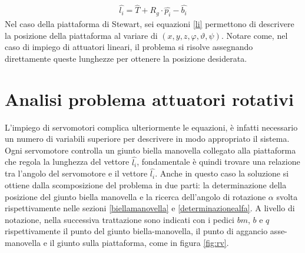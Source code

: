 \documentclass[12pt,twoside,openright]{report}
\begin{document}
\begin{align}\label{li}
\hat{l_i}=\hat{T}+R_g\cdot \hat{p_i}-\hat{b_i}
\end{align}
Nel caso della piattaforma di Stewart, sei equazioni \eqref{li} permettono di descrivere la posizione della piattaforma al variare di $(x,y,z,\varphi,\vartheta,\psi)$.
Notare come, nel caso di impiego di attuatori lineari, il problema si risolve assegnando direttamente queste lunghezze per ottenere la posizione desiderata. 

\section{Analisi problema attuatori rotativi}\label{rotation}
L'impiego di servomotori complica ulteriormente le equazioni, è infatti necessario un numero di variabili superiore per descrivere in modo appropriato il sistema. Ogni servomotore controlla un giunto biella manovella collegato alla piattaforma che regola la lunghezza del vettore $\hat{l_i}$, fondamentale è quindi trovare una relazione tra l'angolo del servomotore e il vettore $\hat{l_i}$. Anche in questo caso la soluzione si ottiene dalla scomposizione del problema in due parti: la determinazione della posizione del giunto biella manovella e la ricerca dell'angolo di rotazione $\alpha$ svolta rispettivamente nelle sezioni \ref{biellamanovella} e \ref{determinazionealfa}. A livello di notazione, nella successiva trattazione sono indicati con i pedici $bm$, $b$ e $q$ rispettivamente il punto del giunto biella-manovella, il punto di aggancio asse-manovella e il giunto sulla piattaforma, come in figura \ref{fig:rv}.
\end{document}
